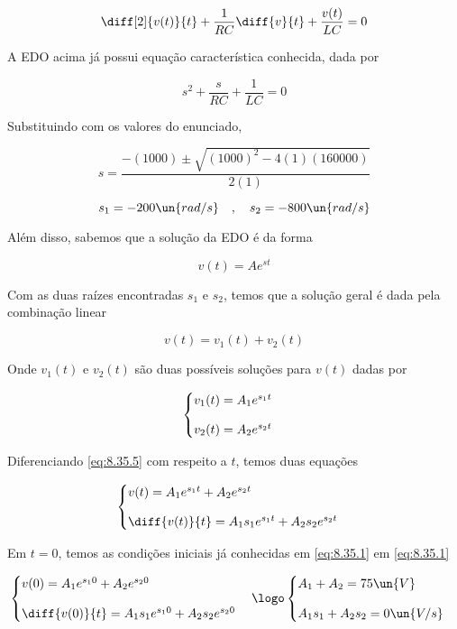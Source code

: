 \[ \diff[2]{v(t)}{t} + \frac{1}{RC} \diff{v}{t} + \frac{v(t)}{LC} = 0  \]

A EDO acima já possui equação característica conhecida, dada por 

\begin{equation}\label{eq:8.35.4}
    s^2 + \frac{s}{RC} + \frac{1}{LC} = 0
\end{equation}

Substituindo com os valores do enunciado,

\[ s = \frac{-(1000) \pm \sqrt{(1000)^2 - 4(1)(160000)}}{2(1)} \]

\[ s_1 = -200 \un{rad/s} \quad , \quad s_2 = -800 \un{rad/s} \]

Além disso, sabemos que a solução da EDO é da forma

\[ v(t) = Ae^{st}  \]

Com as duas raízes encontradas $s_1$ e $s_2$, temos que a solução geral é dada pela combinação linear

\begin{equation}\label{eq:8.35.5}
    v(t) = v_1(t) + v_2(t)
\end{equation}

Onde $v_1(t)$ e $v_2(t)$ são duas possíveis soluções para $v(t)$ dadas por  

\[ \begin{cases}
        v_1(t) = A_1e^{s_1t}  & \\
        \noalign{\vskip9pt}
        v_2(t) = A_2e^{s_2t}
    \end{cases}
\]

Diferenciando \eqref{eq:8.35.5} com respeito a $t$, temos duas equações

\[ \begin{cases}
        v(t) = A_1e^{s_1t} + A_2e^{s_2t} & \\
        \noalign{\vskip9pt}
        \diff{v(t)}{t} = A_1s_1e^{s_1t} + A_2s_2e^{s_2t}
    \end{cases}
\]

Em $t=0$, temos as condições iniciais já conhecidas em \eqref{eq:8.35.1} em \eqref{eq:8.35.1}

\[ \begin{cases}
        v(0) = A_1e^{s_10} + A_2e^{s_20} & \\
        \noalign{\vskip9pt}
        \diff{v(0)}{t} = A_1s_1e^{s_10} + A_2s_2e^{s_20}
    \end{cases}
    \logo
    \begin{cases}
        A_1 + A_2 = 75 \un{V} & \\
        \noalign{\vskip9pt}
        A_1s_1 + A_2s_2 = 0 \un{V/s}
    \end{cases}
\]

